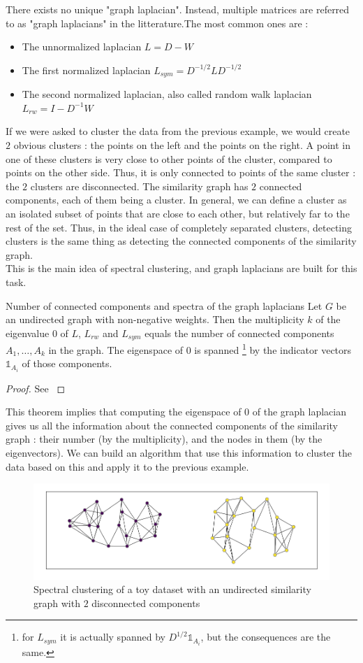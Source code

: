 \documentclass[a4paper,12pt]{article}
\theoremstyle{definition}
\theoremstyle{plain}
\def\1char{\mathbb{1}}
\begin{document}
There exists no unique "graph laplacian". Instead, multiple matrices are referred to as "graph laplacians" in the litterature.The most common ones are :
\begin{itemize}
	\item The unnormalized laplacian $L = D - W$
	\item The first normalized laplacian $L_{sym}=D^{-1/2}LD^{-1/2}$
	\item The second normalized laplacian, also called random walk laplacian $L_{rw}= I - D^{-1}W$
\end{itemize}

If we were asked to cluster the data from the previous example, we would create $2$ obvious clusters : the points on the left and the points on the right. A point in one of these clusters is very close to other points of the cluster, compared to points on the other side. Thus, it is only connected to points of the same cluster : the $2$ clusters are disconnected.
The similarity graph has $2$ connected components, each of them being a cluster. 
In general, we can define a cluster as an isolated subset of points that are close to each other, but relatively far to the rest of the set. Thus, in the ideal case of completely separated clusters, detecting clusters is the same thing as detecting the connected components of the similarity graph. \\
This is the main idea of spectral clustering, and graph laplacians are built for this task.
\begin{theo*}{Number of connected components and spectra of the graph laplacians}
	Let $G$ be an undirected graph with
	non-negative weights. Then the multiplicity $k$ of the eigenvalue
	$0$ of $L$, $L_{rw}$ and $L_{sym}$ equals the number of connected
	components $A_1, \hdots, A_k$ in the graph. The eigenspace of $0$ is
	spanned \footnote{for $L_{sym}$ it is actually spanned by $D^{1/2} \1char_{A_i}$, but the consequences are the same.} by the indicator vectors $\1char_{A_i}$ of those
	components.
\end{theo*}

\begin{proof}
	See \cite{tutorial}
\end{proof}
This theorem implies that computing the eigenspace of $0$ of the graph laplacian gives us all the information about the connected components of the similarity graph : their number (by the multiplicity), and the nodes in them (by the eigenvectors). We can build an algorithm that use this information to cluster the data based on this and apply it to the previous example.
\begin{figure}[H]
	\centering
	\includegraphics[width=0.6\linewidth]{figures/clustering_example}
	\caption{Spectral clustering of a toy dataset with an undirected similarity graph with $2$ disconnected components}
	\label{fig:c_example}
\end{figure}
\end{document}
